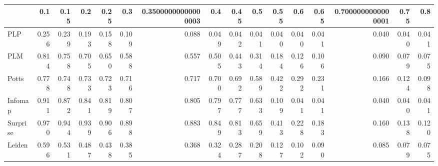 \begin{tabular}{lrrrrrrrrrrrrrrr}
\toprule
{} &   0.1 &  0.15 &   0.2 &  0.25 &   0.3 & 0.35000000000000003 &   0.4 &  0.45 &   0.5 &  0.55 &   0.6 &  0.65 & 0.7000000000000001 &  0.75 &   0.8 \\
\midrule
PLP      & 0.256 & 0.239 & 0.193 & 0.158 & 0.109 &               0.088 & 0.049 & 0.042 & 0.041 & 0.040 & 0.040 & 0.041 &              0.040 & 0.040 & 0.041 \\
PLM      & 0.814 & 0.758 & 0.705 & 0.650 & 0.588 &               0.557 & 0.505 & 0.443 & 0.314 & 0.184 & 0.126 & 0.106 &              0.090 & 0.079 & 0.075 \\
Potts    & 0.778 & 0.748 & 0.733 & 0.723 & 0.716 &               0.717 & 0.700 & 0.692 & 0.589 & 0.422 & 0.292 & 0.231 &              0.166 & 0.124 & 0.098 \\
Infomap  & 0.911 & 0.872 & 0.841 & 0.819 & 0.807 &               0.805 & 0.797 & 0.777 & 0.633 & 0.109 & 0.041 & 0.041 &              0.040 & 0.040 & 0.041 \\
Surprise & 0.970 & 0.944 & 0.939 & 0.906 & 0.898 &               0.883 & 0.849 & 0.813 & 0.659 & 0.413 & 0.228 & 0.183 &              0.160 & 0.138 & 0.120 \\
Leiden   & 0.596 & 0.531 & 0.487 & 0.438 & 0.385 &               0.368 & 0.324 & 0.287 & 0.208 & 0.127 & 0.102 & 0.090 &              0.085 & 0.079 & 0.075 \\
\bottomrule
\end{tabular}
